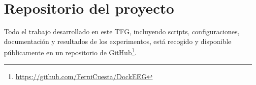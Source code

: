 \section{Repositorio del proyecto}\label{sec:repositorio}

Todo el trabajo desarrollado en este TFG, incluyendo scripts, configuraciones, documentación y resultados de los experimentos, está recogido y disponible públicamente en un repositorio de GitHub\footnote{\url{https://github.com/FerniCuesta/DockEEG}}.
